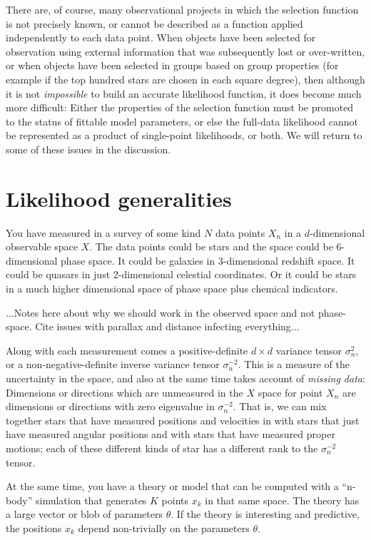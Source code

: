 \documentclass[12pt,pdftex,preprint]{aastex}
\begin{document}
There are, of course, many observational projects in which the
selection function is not precisely known, or cannot be described
as a function applied independently to each data point.
When objects have been selected for observation using external
information that was subsequently lost or over-written, or when
objects have been selected in groups based on group properties
(for example if the top hundred stars are chosen in each square
degree), then although it is not \emph{impossible} to build an
accurate likelihood function, it does become much more difficult:
Either the properties of the selection function must be promoted
to the status of fittable model parameters, or else the full-data
likelihood cannot be represented as a product of single-point
likelihoods, or both.  We will return to some of these issues in
the discussion.

\section{Likelihood generalities}

You have measured in a survey of some kind $N$ data points $X_n$ in a
$d$-dimensional observable space $X$.  The data points could be stars
and the space could be 6-dimensional phase space.  It could be
galaxies in 3-dimensional redshift space.  It could be quasars in just
2-dimensional celestial coordinates.  Or it could be stars in a much
higher dimensional space of phase space plus chemical indicators.

...Notes here about why we should work in the observed space and not
phase-space.  Cite issues with parallax and distance infecting
everything...

Along with each measurement comes a positive-definite $d\times d$
variance tensor $\sigma^2_n$, or a non-negative-definite inverse
variance tensor $\sigma^{-2}_n$.  This is a measure of the uncertainty
in the space, and also at the same time takes account of \emph{missing
  data}: Dimensions or directions which are unmeasured in the $X$
space for point $X_n$ are dimensions or directions with zero
eigenvalue in $\sigma^{-2}_n$.  That is, we can mix together stars
that have measured positions and velocities in with stars that just
have measured angular positions and with stars that have measured
proper motions; each of these different kinds of star has a different
rank to the $\sigma^{-2}_n$ tensor.

At the same time, you have a theory or model that can be computed with
a ``n-body'' simulation that generates $K$ points $x_k$ in that same
space.  The theory has a large vector or blob of parameters $\theta$.
If the theory is interesting and predictive, the positions $x_k$
depend non-trivially on the parameters $\theta$.
\end{document}
